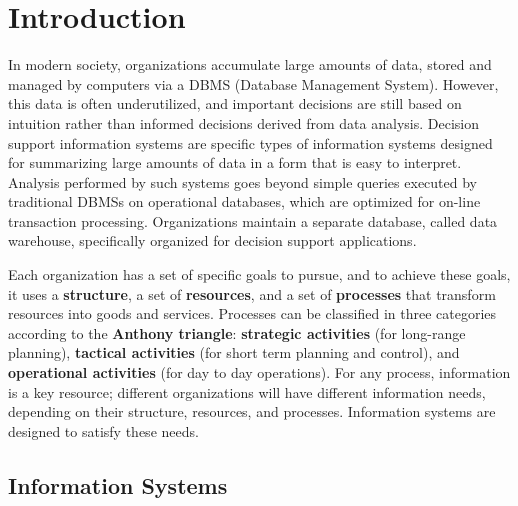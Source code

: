 \chapter{Introduction}

In modern society, organizations accumulate large amounts of data, stored and managed by computers via a DBMS (Database Management System). However, this data is often underutilized, and important decisions are still based on intuition rather than informed decisions derived from data analysis. Decision support information systems are specific types of information systems designed for summarizing large amounts of data in a form that is easy to interpret. Analysis performed by such systems goes beyond simple queries executed by traditional DBMSs on operational databases, which are optimized for on-line transaction processing. Organizations maintain a separate database, called data warehouse, specifically organized for decision support applications.




Each organization has a set of specific goals to pursue, and to achieve these goals, it uses a \textbf{structure}, a set of \textbf{resources}, and a set of \textbf{processes} that transform resources into goods and services. Processes can be classified in three categories according to the \textbf{Anthony triangle}: \textbf{strategic activities} (for long-range planning), \textbf{tactical activities} (for short term planning and control), and \textbf{operational activities} (for day to day operations). For any process, information is a key resource; different organizations will have different information needs, depending on their structure, resources, and processes. Information systems are designed to satisfy these needs.

\section{Information Systems}

